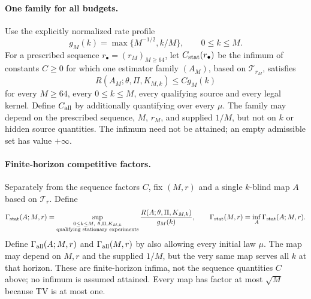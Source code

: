 \documentclass[11pt,letterpaper]{article}
\newcommand{\cT}{\mathcal T}
\theoremstyle{definition}
\theoremstyle{remark}
\numberwithin{equation}{section}
\begin{document}
\paragraph{One family for all budgets.}
Use the explicitly normalized rate profile
\begin{equation}\label{eq:benchmark}
 g_M(k)=\max\{M^{-1/2},k/M\},\qquad 0\le k\le M.
\end{equation}
For a prescribed sequence $r_\bullet=(r_M)_{M\ge64}$, let $C_{\rm stat}(r_\bullet)$ be the infimum of constants $C\ge0$ for which one estimator family $(A_M)$, based on $\cT_{r_M}$, satisfies
\begin{equation}\label{eq:factor}
 R(A_M;\theta,\Pi,K_{M,k})\le Cg_M(k)
\end{equation}
for every $M\ge64$, every $0\le k\le M$, every qualifying source and every legal kernel. Define $C_{\rm all}$ by additionally quantifying over every $\mu$. The family may depend on the prescribed sequence, $M$, $r_M$, and supplied $1/M$, but not on $k$ or hidden source quantities. The infimum need not be attained; an empty admissible set has value $+\infty$.

\paragraph{Finite-horizon competitive factors.}
Separately from the sequence factors $C$, fix $(M,r)$ and a single
$k$-blind map $A$ based on $\cT_r$. Define
\begin{equation}\label{eq:finite-factor}
 \Gamma_{\rm stat}(A;M,r)
 =\sup_{\substack{0\le k\le M,\ \theta,\Pi,K_{M,k}\\
                  \text{qualifying stationary experiments}}}
 \frac{R(A;\theta,\Pi,K_{M,k})}{g_M(k)},\qquad
 \Gamma_{\rm stat}(M,r)=\inf_A\Gamma_{\rm stat}(A;M,r).
\end{equation}
Define $\Gamma_{\rm all}(A;M,r)$ and $\Gamma_{\rm all}(M,r)$ by also
allowing every initial law $\mu$. The map may depend on $M,r$ and the
supplied $1/M$, but the very same map serves all $k$ at that horizon.
These are finite-horizon infima, not the sequence quantities $C$ above;
no infimum is assumed attained. Every map has factor at most $\sqrt M$
because TV is at most one.
\end{document}
